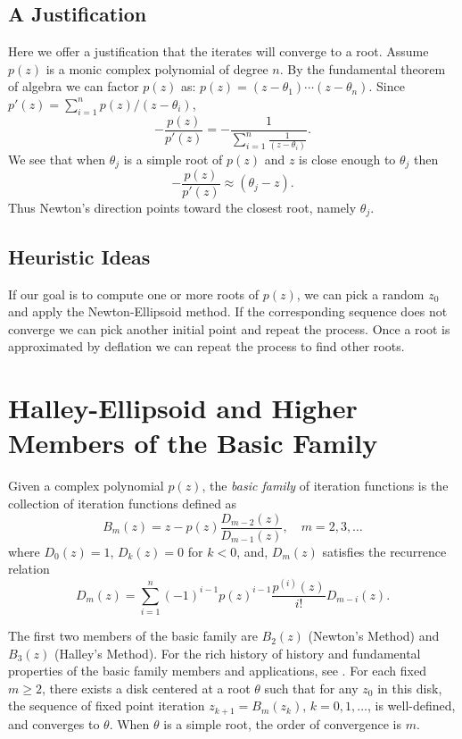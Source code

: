 \documentclass{article}
\begin{document}
\subsection{A Justification}
Here we offer a justification that the iterates will converge to a root.
Assume $p(z)$ is a monic complex polynomial of degree $n$. By the fundamental theorem of algebra we can factor $p(z)$ as: $p(z)=(z-\theta_1) \cdots (z-\theta_n)$.
Since $p'(z)= \sum_{i=1}^n p(z)/(z- \theta_i)$,
$$- \frac{p(z)}{p'(z)}= - \frac{1}{\sum_{i=1}^n \frac{1}{(z- \theta_i)}}.$$
We see that when $\theta_j$ is a simple root of $p(z)$ and $z$ is close enough to $\theta_j$ then
$$- \frac{p(z)}{p'(z)} \approx (\theta_j - z).$$
Thus Newton's direction points toward the closest root, namely $\theta_j$.

\subsection{Heuristic Ideas}  If our goal is to compute one or more roots of $p(z)$,  we can pick a random $z_0$ and apply the Newton-Ellipsoid method. If the corresponding sequence does not converge we can pick another initial point and repeat the process. Once a root is approximated by deflation we can repeat the process to find other roots.

\section{Halley-Ellipsoid and Higher Members of the Basic Family}

Given a complex polynomial $p(z)$, the {\it basic family} of iteration functions is the collection of iteration functions defined as
$$B_m(z)=z-p(z) \frac{D_{m-2}(z)} {D_{m-1}(z)}, \quad m=2,3, \dots$$
where  $D_0(z)=1$,  $D_k(z)=0$ for $k <0$, and, $D_m(z)$ satisfies the recurrence relation
$$
D_m(z)= \sum_{i=1}^n (-1)^{i-1}p(z)^{i-1}\frac{p^{(i)}(z)}{i!}D_{m-i}(z).$$

The first two members of the basic family are $B_2(z)$ (Newton's Method) and $B_3(z)$ (Halley's Method).  For the rich  history of history and fundamental properties of the basic family members and applications, see \cite{kalbook}.  For each fixed $m \geq 2$, there exists a disk centered at a root $\theta$ such that for any $z_0$ in this disk, the sequence of fixed point iteration
$z_{k+1}=B_m(z_k)$, $k=0,1,\dots$, is well-defined, and converges to $\theta$.  When  $\theta$ is a simple
root,  the order of convergence is $m$.
\end{document}
